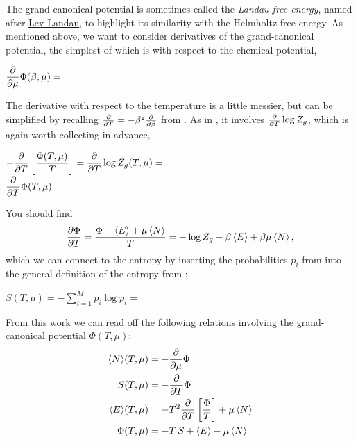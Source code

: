 The grand-canonical potential is sometimes called the \textit{Landau free energy}, named after \href{https://en.wikipedia.org/wiki/Lev_Landau}{Lev Landau}, to highlight its similarity with the Helmholtz free energy.
As mentioned above, we want to consider derivatives of the grand-canonical potential, the simplest of which is with respect to the chemical potential,
\begin{mdframed}
  $\displaystyle \frac{\partial }{\partial \mu} \Phi(\beta, \mu) = $ \\[120 pt]
\end{mdframed}
The derivative with respect to the temperature is a little messier, but can be simplified by recalling $\frac{\partial }{\partial T} = -\beta^2 \frac{\partial }{\partial \beta}$ from .
As in , it involves $\frac{\partial }{\partial T} \log Z_g$, which is again worth collecting in advance,
\begin{mdframed}
  $\displaystyle -\frac{\partial }{\partial T}\left[\frac{\Phi(T, \mu)}{T}\right] = \frac{\partial }{\partial T} \log Z_g(T, \mu) = $ \\[100 pt]
  $\displaystyle \frac{\partial }{\partial T} \Phi(T, \mu) = $ \\[80 pt]
\end{mdframed}
\newpage %
\noindent You should find
\begin{equation*}
  \frac{\partial \Phi}{\partial T} = \frac{\Phi - \left\langle E \right\rangle + \mu\left\langle N \right\rangle}{T} = -\log Z_g - \beta\left\langle E \right\rangle + \beta\mu\left\langle N \right\rangle,
\end{equation*}
which we can connect to the entropy by inserting the probabilities $p_i$ from  into the general definition of the entropy from :
\begin{mdframed}
  $\displaystyle S(T, \mu) = -\sum_{i = 1}^M p_i \log p_i = $ \\[100 pt]
\end{mdframed}

\begin{shaded}
  From this work we can read off the following relations involving the grand-canonical potential $\Phi(T, \mu)$:
  \begin{align}
    \left\langle N \right\rangle\!(T, \mu) & = -\frac{\partial }{\partial \mu} \Phi \label{eq:N_grand} \\
            S(T, \mu) & = -\frac{\partial }{\partial T} \Phi \\
    \left\langle E \right\rangle\!(T, \mu) & = -T^2 \frac{\partial }{\partial T} \left[\frac{\Phi}{T}\right] + \mu \left\langle N \right\rangle \label{eq:E_grand} \\
         \Phi(T, \mu) & = -T \, S + \left\langle E \right\rangle - \mu \left\langle N \right\rangle \label{eq:grand_relation}
  \end{align}
\end{shaded}

